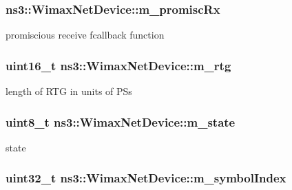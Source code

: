 \subsubsection[{\texorpdfstring{m\+\_\+promisc\+Rx}{m_promiscRx}}]{ ns3\+::\+Wimax\+Net\+Device\+::m\+\_\+promisc\+Rx\hspace{0.3cm}{\ttfamily [private]}}\hypertarget{classns3_1_1WimaxNetDevice_a18ecb5f1655bde8362564adf7c017475}{}\label{classns3_1_1WimaxNetDevice_a18ecb5f1655bde8362564adf7c017475}


promiscious receive fcallback function 

\subsubsection[{\texorpdfstring{m\+\_\+rtg}{m_rtg}}]{\setlength{\rightskip}{0pt plus 5cm}uint16\+\_\+t ns3\+::\+Wimax\+Net\+Device\+::m\+\_\+rtg\hspace{0.3cm}{\ttfamily [private]}}\hypertarget{classns3_1_1WimaxNetDevice_af5cff1eacbdbfa335bacbebe2191a552}{}\label{classns3_1_1WimaxNetDevice_af5cff1eacbdbfa335bacbebe2191a552}


length of R\+TG in units of P\+Ss 

\subsubsection[{\texorpdfstring{m\+\_\+state}{m_state}}]{\setlength{\rightskip}{0pt plus 5cm}uint8\+\_\+t ns3\+::\+Wimax\+Net\+Device\+::m\+\_\+state\hspace{0.3cm}{\ttfamily [private]}}\hypertarget{classns3_1_1WimaxNetDevice_a23e30d6035386b7e3b2daa630cf8a44e}{}\label{classns3_1_1WimaxNetDevice_a23e30d6035386b7e3b2daa630cf8a44e}


state 

\subsubsection[{\texorpdfstring{m\+\_\+symbol\+Index}{m_symbolIndex}}]{\setlength{\rightskip}{0pt plus 5cm}uint32\+\_\+t ns3\+::\+Wimax\+Net\+Device\+::m\+\_\+symbol\+Index\hspace{0.3cm}{\ttfamily [private]}}\hypertarget{classns3_1_1WimaxNetDevice_ae1c1580ec03c9632b46bc8a16eeb9ee5}{}\label{classns3_1_1WimaxNetDevice_ae1c1580ec03c9632b46bc8a16eeb9ee5}


